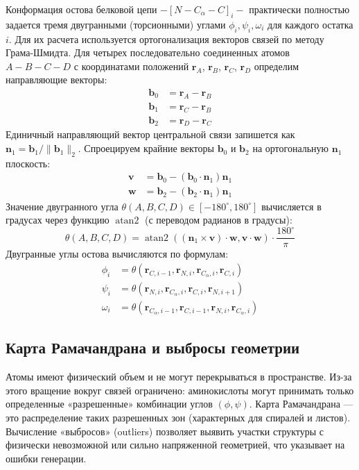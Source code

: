 \documentclass[12pt, a4paper]{article}
\begin{document}
Конформация остова белковой цепи $-[N - C_\alpha - C]_i-$ практически полностью задается тремя двугранными (торсионными) углами $\phi_i, \psi_i, \omega_i$ для каждого остатка $i$.
Для их расчета используется ортогонализация векторов связей по методу Грама-Шмидта. Для четырех последовательно соединенных атомов $A-B-C-D$ с координатами положений $\mathbf{r}_A$, $\mathbf{r}_B$, $\mathbf{r}_C$, $\mathbf{r}_D$ определим направляющие векторы:
\begin{align}
    \mathbf{b}_0 &= \mathbf{r}_A - \mathbf{r}_B \\
    \mathbf{b}_1 &= \mathbf{r}_C - \mathbf{r}_B \\
    \mathbf{b}_2 &= \mathbf{r}_D - \mathbf{r}_C
\end{align}
Единичный направляющий вектор центральной связи запишется как $\mathbf{n}_1 = \mathbf{b}_1 / \|\mathbf{b}_1\|_2$. Спроецируем крайние векторы $\mathbf{b}_0$ и $\mathbf{b}_2$ на ортогональную $\mathbf{n}_1$ плоскость:
\begin{align}
    \mathbf{v} &= \mathbf{b}_0 - (\mathbf{b}_0 \cdot \mathbf{n}_1)\mathbf{n}_1 \\
    \mathbf{w} &= \mathbf{b}_2 - (\mathbf{b}_2 \cdot \mathbf{n}_1)\mathbf{n}_1
\end{align}
Значение двугранного угла $\theta(A, B, C, D) \in [-180^\circ, 180^\circ]$ вычисляется в градусах через функцию $\operatorname{atan2}$ (с переводом радианов в градусы):
\begin{equation}
    \theta(A, B, C, D) = \operatorname{atan2}\left( (\mathbf{n}_1 \times \mathbf{v}) \cdot \mathbf{w}, \mathbf{v} \cdot \mathbf{w} \right) \cdot \frac{180^\circ}{\pi}
\end{equation}
Двугранные углы остова вычисляются по формулам:
\begin{align}
    \phi_i &= \theta(\mathbf{r}_{C, i-1}, \mathbf{r}_{N, i}, \mathbf{r}_{C_\alpha, i}, \mathbf{r}_{C, i}) \\
    \psi_i &= \theta(\mathbf{r}_{N, i}, \mathbf{r}_{C_\alpha, i}, \mathbf{r}_{C, i}, \mathbf{r}_{N, i+1}) \\
    \omega_i &= \theta(\mathbf{r}_{C_\alpha, i-1}, \mathbf{r}_{C, i-1}, \mathbf{r}_{N, i}, \mathbf{r}_{C_\alpha, i})
\end{align}

\subsection{Карта Рамачандрана и выбросы геометрии}
Атомы имеют физический объем и не могут перекрываться в пространстве. Из-за этого вращение вокруг связей ограничено: аминокислоты могут принимать только определенные «разрешенные» комбинации углов $(\phi, \psi)$. Карта Рамачандрана — это распределение таких разрешенных зон (характерных для спиралей и листов). Вычисление «выбросов» (outliers) позволяет выявить участки структуры с физически невозможной или сильно напряженной геометрией, что указывает на ошибки генерации.
\end{document}
